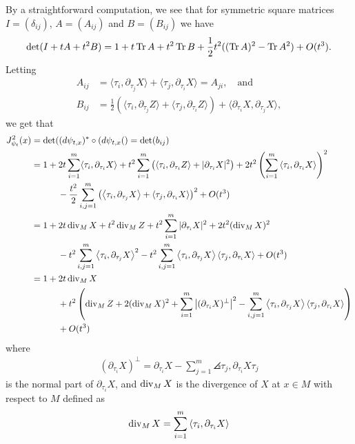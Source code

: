 By a straightforward computation, we see that for symmetric square matrices $I=(\delta_{ij})$, $A=(A_{ij})$ and $B=(B_{ij})$ we have
\begin{align*}
    \det(I+tA+t^2B) = 1+t\operatorname{Tr} A + t^2 \operatorname{Tr} B + \frac{1}{2}t^2((\operatorname{Tr} A)^2 -\operatorname{Tr} A^2) + O(t^3).
\end{align*}
Letting
\begin{align*}
    A_{ij} &= \langle \tau_i, \partial_{\tau_j}X \rangle + \langle \tau_j, \partial_{\tau_i}X \rangle = A_{ji}, \quad \text{and} \\
    B_{ij} &= \frac{1}{2}(\langle \tau_i, \partial_{\tau_j}Z \rangle + \langle \tau_j, \partial_{\tau_i}Z \rangle) + \langle \partial_{\tau_i}X, \partial_{\tau_j}X \rangle,
\end{align*}
we get that
\begin{align*}
    J_{\psi_t}^2(x) &= \det((d\psi_{t,x})^* \circ (d\psi_{t,x}() = \det(b_{ij}) \\
    &= 1 + 2t \sum_{i=1}^m \langle \tau_i, \partial_{\tau_i}X \rangle + t^2 \sum_{i=1}^m \left( \left\langle\tau_i, \partial_{\tau_i}Z\right\rangle + |\partial_{\tau_i}X|^2 \right) + 2t^2 \left( \sum_{i=1}^m \left\langle\tau_i, \partial_{\tau_i}X\right\rangle \right)^2  \\
    & \qquad\quad - \frac{t^2}{2}\sum_{i,j=1}^m\left(\left\langle\tau_i,\partial_{\tau_j}X\right\rangle + \left\langle\tau_j, \partial_{\tau_i}X\right\rangle\right)^2 + O(t^3) \\
    &= 1 + 2t\operatorname{div}_M X + t^2 \operatorname{div}_M Z + t^2\sum_{i=1}^m|\partial_{\tau_i}X|^2 + 2t^2(\operatorname{div}_M X)^2  \\
    & \qquad\quad - t^2\sum_{i,j=1}^m\left\langle\tau_i, \partial_{\tau_j}X\right\rangle^2 - t^2\sum_{i,j=1}^m\left\langle\tau_i, \partial_{\tau_j}X\right\rangle\left\langle\tau_j, \partial_{\tau_i}X\right\rangle + O(t^3) \\
    &= 1 + 2t \operatorname{div}_M X \\
    & \qquad\quad + t^2\left( \operatorname{div}_M Z + 2(\operatorname{div}_M X)^2 +  \sum_{i=1}^m\left| (\partial_{\tau_i}X)^{\perp} \right|^2 - \sum_{i,j=1}^m\left\langle\tau_i, \partial_{\tau_j}X\right\rangle\left\langle\tau_j, \partial_{\tau_i}X\right\rangle\right) \\
    & \qquad \quad + O(t^3)
\end{align*}
where 
\begin{align*}
    (\partial_{\tau_i}X)^{\perp}=\partial_{\tau_i}X - \sum_{j=1}^m\angles{\tau_j, \partial_{\tau_i}X}\tau_j
\end{align*}
is the normal part of $\partial_{\tau_i}X$, and $\operatorname{div}_M X$ is the divergence of $X$ at $x \in M$ with respect to $M$ defined as
\begin{align*}
    \operatorname{div}_M X = \sum_{i=1}^m\left\langle\tau_i, \partial_{\tau_i}X\right\rangle
\end{align*}
